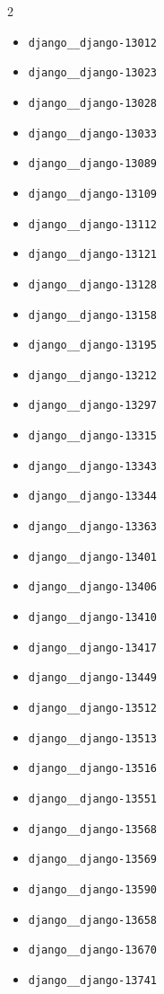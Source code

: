 \documentclass{article}
\begin{document}
\begin{multicols}{2}
\begin{itemize}
    \item \texttt{django\_\_django-13012}
    \item \texttt{django\_\_django-13023}
    \item \texttt{django\_\_django-13028}
    \item \texttt{django\_\_django-13033}
    \item \texttt{django\_\_django-13089}
    \item \texttt{django\_\_django-13109}
    \item \texttt{django\_\_django-13112}
    \item \texttt{django\_\_django-13121}
    \item \texttt{django\_\_django-13128}
    \item \texttt{django\_\_django-13158}
    \item \texttt{django\_\_django-13195}
    \item \texttt{django\_\_django-13212}
    \item \texttt{django\_\_django-13297}
    \item \texttt{django\_\_django-13315}
    \item \texttt{django\_\_django-13343}
    \item \texttt{django\_\_django-13344}
    \item \texttt{django\_\_django-13363}
    \item \texttt{django\_\_django-13401}
    \item \texttt{django\_\_django-13406}
    \item \texttt{django\_\_django-13410}
    \item \texttt{django\_\_django-13417}
    \item \texttt{django\_\_django-13449}
    \item \texttt{django\_\_django-13512}
    \item \texttt{django\_\_django-13513}
    \item \texttt{django\_\_django-13516}
    \item \texttt{django\_\_django-13551}
    \item \texttt{django\_\_django-13568}
    \item \texttt{django\_\_django-13569}
    \item \texttt{django\_\_django-13590}
    \item \texttt{django\_\_django-13658}
    \item \texttt{django\_\_django-13670}
    \item \texttt{django\_\_django-13741}

\end{itemize}
\end{multicols}
\end{document}
